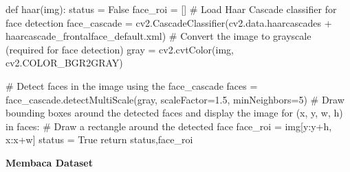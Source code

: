 \documentclass[
  letterpaper,
  DIV=11,
  numbers=noendperiod]{scrreprt}
\newenvironment{Shaded}{\begin{snugshade}}{\end{snugshade}}
\newcommand{\CommentTok}[1]{\textcolor[rgb]{0.37,0.37,0.37}{#1}}
\newcommand{\ControlFlowTok}[1]{\textcolor[rgb]{0.00,0.23,0.31}{#1}}
\newcommand{\DecValTok}[1]{\textcolor[rgb]{0.68,0.00,0.00}{#1}}
\newcommand{\FloatTok}[1]{\textcolor[rgb]{0.68,0.00,0.00}{#1}}
\newcommand{\KeywordTok}[1]{\textcolor[rgb]{0.00,0.23,0.31}{#1}}
\newcommand{\NormalTok}[1]{\textcolor[rgb]{0.00,0.23,0.31}{#1}}
\newcommand{\OperatorTok}[1]{\textcolor[rgb]{0.37,0.37,0.37}{#1}}
\newcommand{\StringTok}[1]{\textcolor[rgb]{0.13,0.47,0.30}{#1}}
\newcommand{\VariableTok}[1]{\textcolor[rgb]{0.07,0.07,0.07}{#1}}
\begin{document}
\begin{Shaded}
\begin{Highlighting}[]
\KeywordTok{def}\NormalTok{ haar(img):}
\NormalTok{    status }\OperatorTok{=} \VariableTok{False}
\NormalTok{    face\_roi }\OperatorTok{=}\NormalTok{ []}
    \CommentTok{\# Load Haar Cascade classifier for face detection}
\NormalTok{    face\_cascade }\OperatorTok{=}\NormalTok{ cv2.CascadeClassifier(cv2.data.haarcascades }\OperatorTok{+} \StringTok{\textquotesingle{}haarcascade\_frontalface\_default.xml\textquotesingle{}}\NormalTok{)}
    \CommentTok{\# Convert the image to grayscale (required for face detection)}
\NormalTok{    gray }\OperatorTok{=}\NormalTok{ cv2.cvtColor(img, cv2.COLOR\_BGR2GRAY)}

    \CommentTok{\# Detect faces in the image using the face\_cascade}
\NormalTok{    faces }\OperatorTok{=}\NormalTok{ face\_cascade.detectMultiScale(gray, scaleFactor}\OperatorTok{=}\FloatTok{1.5}\NormalTok{, minNeighbors}\OperatorTok{=}\DecValTok{5}\NormalTok{)}
    \CommentTok{\# Draw bounding boxes around the detected faces and display the image}
    \ControlFlowTok{for}\NormalTok{ (x, y, w, h) }\KeywordTok{in}\NormalTok{ faces:}
        \CommentTok{\# Draw a rectangle around the detected face}
\NormalTok{        face\_roi }\OperatorTok{=}\NormalTok{ img[y:y}\OperatorTok{+}\NormalTok{h, x:x}\OperatorTok{+}\NormalTok{w]}
\NormalTok{        status }\OperatorTok{=} \VariableTok{True}
    \ControlFlowTok{return}\NormalTok{ status,face\_roi}
\end{Highlighting}
\end{Shaded}

\textbf{Membaca Dataset}
\end{document}
